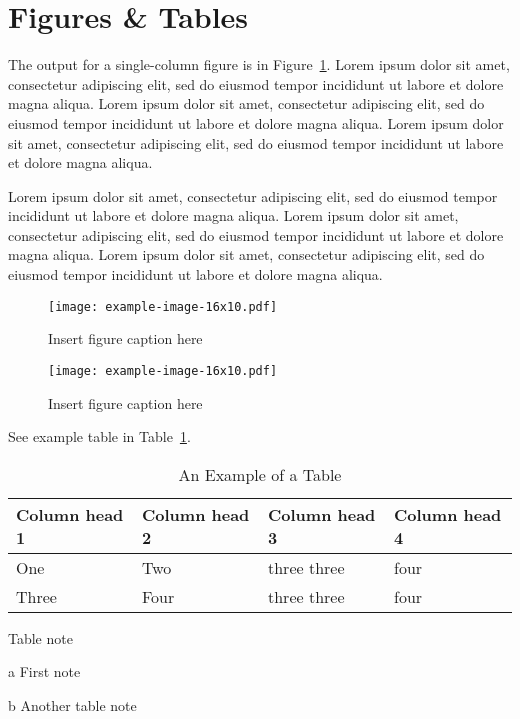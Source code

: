 \documentclass[
  journal=largetwo,
  manuscript=article-type,
  year=2020,
  volume=37,
]{cup-journal}
\begin{document}
\section{Figures \& Tables}

The output for a single-column figure is in Figure~\ref{fig_sim}.  Lorem ipsum dolor sit amet, consectetur adipiscing elit, sed do eiusmod tempor incididunt ut labore et dolore magna aliqua. Lorem ipsum dolor sit amet, consectetur adipiscing elit, sed do eiusmod tempor incididunt ut labore et dolore magna aliqua. Lorem ipsum dolor sit amet, consectetur adipiscing elit, sed do eiusmod tempor incididunt ut labore et dolore magna aliqua. 

Lorem ipsum dolor sit amet, consectetur adipiscing elit, sed do eiusmod tempor incididunt ut labore et dolore magna aliqua. Lorem ipsum dolor sit amet, consectetur adipiscing elit, sed do eiusmod tempor incididunt ut labore et dolore magna aliqua. Lorem ipsum dolor sit amet, consectetur adipiscing elit, sed do eiusmod tempor incididunt ut labore et dolore magna aliqua. 



\begin{figure}[hbt!]
\centering
\texttt{[image: example-image-16x10.pdf]}
\caption{Insert figure caption here}
\label{fig_sim}
\end{figure}


\begin{figure*}
\centering
\texttt{[image: example-image-16x10.pdf]}
\caption{Insert figure caption here}
\label{fig_wide}
\end{figure*}


See example table in Table~\ref{table_example}.

\begin{table}[hbt!]
\begin{threeparttable}
\caption{An Example of a Table}
\label{table_example}
\begin{tabular}{llll}
\toprule
\headrow Column head 1 & Column head 2  & Column head 3 & Column head 4\\
\midrule
One\tnote{a} & Two&three three &four\\ 
\midrule
Three & Four&three three\tnote{b} &four\\
\bottomrule
\end{tabular}
\begin{tablenotes}[hang]
\item[]Table note
\item[a]First note
\item[b]Another table note
\end{tablenotes}
\end{threeparttable}
\end{table}
\end{document}
